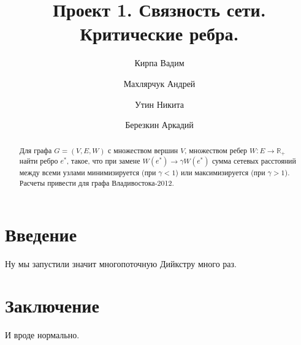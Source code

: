 \documentclass{article}
\begin{document}
\title{Проект 1. Связность сети. Критические ребра.}

\author{
  Кирпа Вадим
  \and
  Махлярчук Андрей
  \and
  Утин Никита
  \and
  Березкин Аркадий
}

\maketitle
\thispagestyle{empty}
\newpage

\begin{abstract}
Для графа $G = (V, E, W)$ с множеством вершин $V$,
множеством ребер $W: E \rightarrow \mathbb{R}_+$
найти ребро $e^*$, такое, что при замене 
$W(e^*) \rightarrow \gamma W(e^*)$ сумма сетевых
расстояний между всеми узлами минимизируется
(при $\gamma < 1$) или максимизируется (при $\gamma > 1$).
Расчеты привести для графа Владивостока-2012.
\end{abstract}

\newpage

\section{Введение}
Ну мы запустили значит многопоточную Дийкстру много раз.

\section{Заключение}
И вроде нормально.
\end{document}
